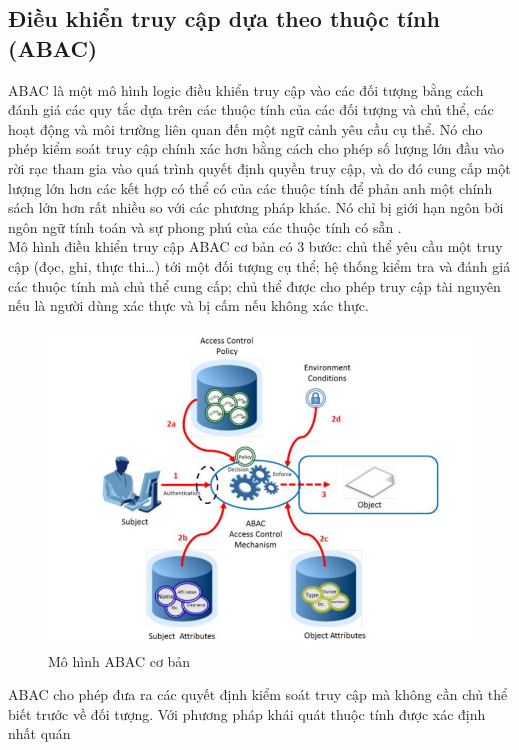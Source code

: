 \subsection{Điều khiển truy cập dựa theo thuộc tính (ABAC)}
ABAC là một mô hình logic điều khiển truy cập vào các đối tượng bằng cách
đánh giá các quy tắc dựa trên các thuộc tính của các đối tượng và chủ thể, các hoạt động
và môi trường liên quan đến một ngữ cảnh yêu cầu cụ thể. Nó cho phép kiểm soát truy
cập chính xác hơn bằng cách cho phép số lượng lớn đầu vào rời rạc tham gia vào quá
trình quyết định quyền truy cập, và do đó cung cấp một lượng lớn hơn các kết hợp có
thể có của các thuộc tính để phản anh một chính sách lớn hơn rất nhiều so với các phương
pháp khác. Nó chỉ bị giới hạn ngôn bởi ngôn ngữ tính toán và sự phong phú của các
thuộc tính có sẵn \cite{hu2015attribute}. \\
\indent Mô hình điều khiển truy cập ABAC cơ bản có 3 bước: chủ thể yêu cầu một truy
cập (đọc, ghi, thực thi…) tới một đối tượng cụ thể; hệ thống kiểm tra và đánh giá các
thuộc tính mà chủ thể cung cấp; chủ thể được cho phép truy cập tài nguyên nếu là người
dùng xác thực và bị cấm nếu không xác thực. \\
\begin{figure}
    \centering
    \includegraphics[scale=0.5]{graphics/chapter-2/chap2-basic-abac.png}
    \caption{Mô hình ABAC cơ bản \cite{hu2013guide}}
    \label{fig:chap2-basic-abac}
\end{figure} 
\indent ABAC cho phép đưa ra các quyết định kiểm soát truy cập mà không cần chủ thể
biết trước về đối tượng. Với phương pháp khái quát thuộc tính được xác định nhất quán
